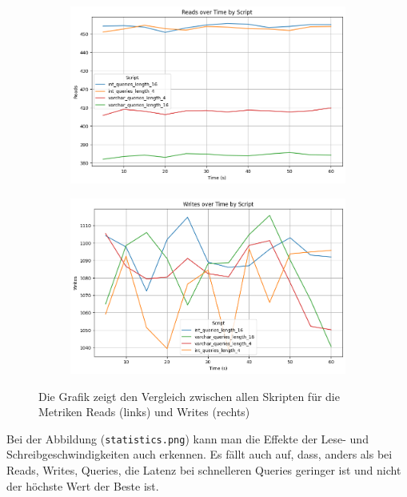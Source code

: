 \begin{figure}[H]
    \centering
    \begin{subfigure}[t]{0.48\textwidth}
        \centering
        \includegraphics[width=\textwidth]{PNGs/Script/Join_Typ/join-type/Reads}
        \label{join-typ-reads}
    \end{subfigure}
    \hfill
    \begin{subfigure}[t]{0.48\textwidth}
        \centering
        \includegraphics[width=\textwidth]{PNGs/Script/Join_Typ/join-type/Writes}
        \label{join-typ-writes}
    \end{subfigure}
    \caption[Join-Typ: Metrikvergleich]{Die Grafik zeigt den Vergleich zwischen allen Skripten für die Metriken Reads (links) und Writes (rechts)}
    \label{fig:join-typ-comp-metric}
\end{figure}
\vspace{-20pt}

Bei der Abbildung (\texttt{statistics.png}) kann man die Effekte der Lese- und Schreibgeschwindigkeiten auch erkennen.
Es fällt auch auf, dass, anders als bei Reads, Writes, Queries, die Latenz bei schnelleren Queries geringer ist und nicht der höchste Wert der Beste ist.

